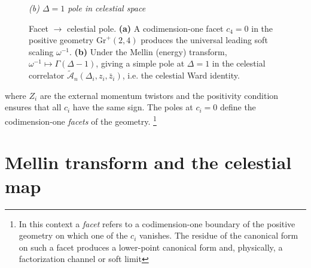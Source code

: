 \documentclass[11pt]{article}
\begin{document}
\begin{figure}[t]
\begin{minipage}{0.42\linewidth}

\vspace{3pt}
\textit{(b) \(\Delta{=}1\) pole in celestial space}
\end{minipage}

\caption{Facet \(\to\) celestial pole. \textbf{(a)} A codimension-one facet \(c_4{=}0\) in the positive geometry \(\mathrm{Gr}^+(2,4)\) produces the universal leading soft scaling \(\omega^{-1}\). \textbf{(b)} Under the Mellin (energy) transform, \(\omega^{-1}\mapsto \Gamma(\Delta{-}1)\), giving a simple pole at \(\Delta{=}1\) in the celestial correlator \(\widetilde{\mathcal A}_n(\Delta_i,z_i,\bar z_i)\), i.e. the celestial Ward identity.}
\label{fig:facet-to-pole}
\end{figure}

where \(Z_i\) are the external momentum twistors and the positivity condition ensures that all \(c_i\) have the same sign.  
The poles at \(c_i=0\) define the codimension-one \emph{facets} of the geometry.
\footnote{
In this context a \emph{facet} refers to a codimension-one boundary of the positive geometry on which one of the $c_i$ vanishes.  
The residue of the canonical form on such a facet produces a lower-point canonical form and, physically, a factorization channel or soft limit}

\section{Mellin transform and the celestial map}
\label{sec:celestial-map}
\end{document}
